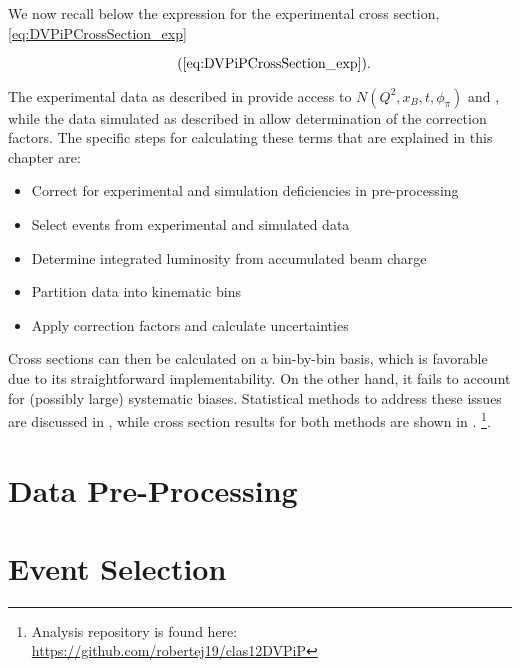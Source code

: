 We now recall below the expression for the experimental cross section, \eqref{eq:DVPiPCrossSection_exp}

        \begin{equation*}
          \recallLabel{eq:DVPiPCrossSection_exp}.
        \end{equation*}

The experimental data as described in  provide access to $N(Q^2,x_B,t,\phi_{\pi})$ and \Lumiint, while the data simulated as described in  allow determination of the correction factors. The specific steps for calculating these terms that are explained in this chapter are: 


\begin{itemize}
  \item Correct for experimental and simulation deficiencies in pre-processing 
  \item Select \dvpip events from experimental and simulated data 
  \item Determine integrated luminosity from accumulated beam charge 
  \item Partition data into kinematic bins 
  \item Apply correction factors and calculate uncertainties 
\end{itemize}

Cross sections can then be calculated on a bin-by-bin basis, which is favorable due to its straightforward implementability. On the other hand, it fails to account for (possibly large) systematic biases. Statistical methods to address these issues are discussed in , while cross section results for both methods are shown in . \footnote{Analysis repository is found here:  \href{https://github.com/robertej19/clas12DVPiP}{https://github.com/robertej19/clas12DVPiP}}.

\section{Data Pre-Processing}\label{sec:Ch4_data_preprocess}
    
    \clearpage
    
\section{Event Selection}\label{sec:Ch4_event_selection}
    
    \clearpage
    
